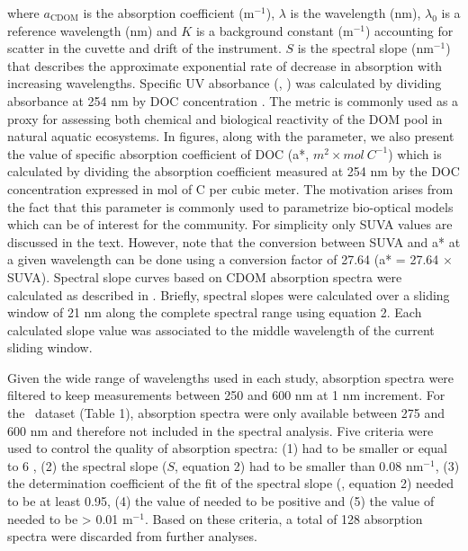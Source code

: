 where $a_{\text{CDOM}}$ is the absorption coefficient (m$^{-1}$), $\lambda$ is the wavelength (nm), $\lambda_0$ is a reference wavelength (nm) and $K$ is a background constant (m$^{-1}$) accounting for scatter in the cuvette and drift of the instrument. $S$ is the spectral slope (nm$^{-1}$) that describes the approximate exponential rate of decrease in absorption with increasing wavelengths. Specific UV absorbance (, \suvagram) was calculated by dividing absorbance at 254 nm by DOC concentration \citep{Weishaar2003}. The  metric is commonly used as a proxy for assessing both chemical \citep{Weishaar2003, Westerhoff2004} and biological reactivity \citep{Berggren2009, Asmala2013} of the DOM pool in natural aquatic ecosystems. In figures, along with the  parameter, we also present the value of specific absorption coefficient of DOC (a*, $m^2 \times mol~C^{-1}$) which is calculated by dividing the absorption coefficient measured at 254 nm by the DOC concentration expressed in mol of C per cubic meter. The motivation arises from the fact that this parameter is commonly used to parametrize bio-optical models which can be of interest for the community. For simplicity only SUVA values are discussed in the text. However, note that the conversion between SUVA and a* at a given wavelength can be done using a conversion factor of 27.64 (a* = 27.64 $\times$ SUVA). Spectral slope curves based on CDOM absorption spectra were calculated as described in \citep{Loiselle2009}. Briefly, spectral slopes were calculated over a sliding window of 21 nm along the complete spectral range using equation 2. Each calculated slope value was associated to the middle wavelength of the current sliding window.

Given the wide range of wavelengths used in each study, absorption spectra were filtered to keep measurements between 250 and 600 nm at 1 nm increment. For the~\cite{Nelson2013} dataset (Table 1), absorption spectra were only available between 275 and 600 nm and therefore not included in the spectral analysis. Five criteria were used to control the quality of absorption spectra: (1)  had to be smaller or equal to 6 \suvagram, (2) the spectral slope ($S$, equation 2) had to be smaller than 0.08 nm$^{-1}$, (3) the determination coefficient of the fit of the spectral slope (\rr, equation 2) needed to be at least 0.95, (4) the value of  needed to be positive and (5) the value of  needed to be > 0.01 m$^{-1}$. Based on these criteria, a total of 128 absorption spectra were discarded from further analyses.


